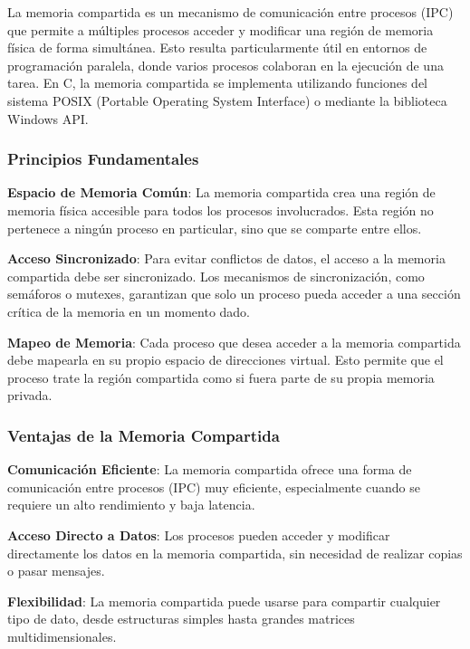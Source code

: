 La memoria compartida es un mecanismo de comunicación entre procesos (IPC) que permite a múltiples procesos acceder y modificar una región de memoria física de forma simultánea. Esto resulta particularmente útil en entornos de programación paralela, donde varios procesos colaboran en la ejecución de una tarea. En C, la memoria compartida se implementa utilizando funciones del sistema POSIX (Portable Operating System Interface) o mediante la biblioteca Windows API.

\subsubsection{Principios Fundamentales}\label{principios-fundamentales}

\textbf{Espacio de Memoria Común}: La memoria compartida crea una región de memoria física accesible para todos los procesos involucrados. Esta región no pertenece a ningún proceso en particular, sino que se comparte entre ellos.

\textbf{Acceso Sincronizado}: Para evitar conflictos de datos, el acceso a la memoria compartida debe ser sincronizado. Los mecanismos de sincronización, como semáforos o mutexes, garantizan que solo un proceso pueda acceder a una sección crítica de la memoria en un momento dado.

\textbf{Mapeo de Memoria}: Cada proceso que desea acceder a la memoria compartida debe mapearla en su propio espacio de direcciones virtual. Esto permite que el proceso trate la región compartida como si fuera parte de su propia memoria privada.

\subsubsection{Ventajas de la Memoria Compartida}\label{ventajas-de-la-memoria-compartida}

\textbf{Comunicación Eficiente}: La memoria compartida ofrece una forma de comunicación entre procesos (IPC) muy eficiente, especialmente cuando se requiere un alto rendimiento y baja latencia.

\textbf{Acceso Directo a Datos}: Los procesos pueden acceder y modificar directamente los datos en la memoria compartida, sin necesidad de realizar copias o pasar mensajes.

\textbf{Flexibilidad}: La memoria compartida puede usarse para compartir cualquier tipo de dato, desde estructuras simples hasta grandes matrices multidimensionales.

